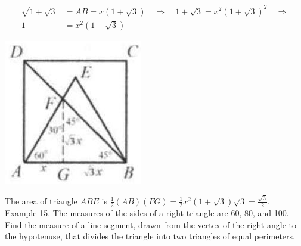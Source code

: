 \documentclass[10pt]{article}
\begin{document}
\[
\begin{aligned}
\sqrt{1+\sqrt{3}} & =A B=x(1+\sqrt{3}) \quad \Rightarrow \quad 1+\sqrt{3}=x^{2}(1+\sqrt{3})^{2} \quad \Rightarrow \\
1 & =x^{2}(1+\sqrt{3})
\end{aligned}
\]

\begin{center}
\includegraphics[max width=\textwidth]{2025_04_17_97bc1f7e44d93c271a88g-083(1)}
\end{center}

The area of triangle \(A B E\) is \(\frac{1}{2}(A B)(F G)=\frac{1}{2} x^{2}(1+\sqrt{3}) \sqrt{3}=\frac{\sqrt{3}}{2}\).\\
Example 15. The measures of the sides of a right triangle are 60, 80, and 100. Find the measure of a line segment, drawn from the vertex of the right angle to the hypotenuse, that divides the triangle into two triangles of equal perimeters.
\end{document}
